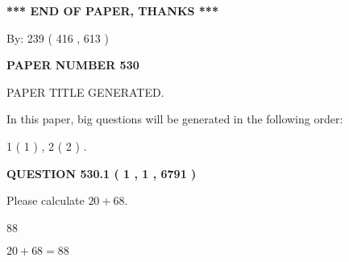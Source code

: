 \documentclass[12pt]{article}
\begin{document}
   
   
   
\vspace{1.0in} 
{\textbf{\large{ *** END OF PAPER, THANKS *** }}} 
   
   
\hspace{1.0in} By: 
 239 ( 416 ,  613 )
   
   
   
   
\newpage 
\setcounter{page}{ 
   530001 } 
   
   
   
   
 {\textbf{ \Large{ PAPER NUMBER  530  }}}
   
   
\vspace{0.2in}
   
   
   
   
   
   
   
   
 \vspace{0.2in}
 
 
 
 
   
   
 PAPER TITLE GENERATED.
   
   
   
\vspace{0.2in}
   
In this paper, big questions will be generated in the following order: 
   
   
   1 ( 1 )
 ,
   2 ( 2 )
 .
  
\vspace{0.2in}
  
{\textbf{\Large{QUESTION
530.1 
 ( 1 , 1 , 6791 )
}}}
  
  
 
Please calculate $ %
20 +  %
68 $.
 
 
 
\noindent{}
 
 

88
 
 
\noindent{}
 
 

 
 
 
\noindent{}
 
 

$ %
20 +  %
68=   %
88$
 
\end{document}
